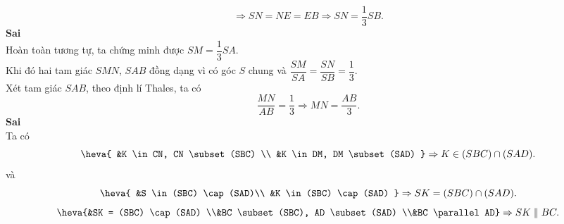 \begin{ex}
{\begin{itemchoice}
			 \[
			 \Rightarrow SN = NE = EB \Rightarrow SN = \dfrac{1}{3}SB.
			\] 
			 \itemch \textbf{Sai}\\
			Hoàn toàn  tương tự, ta chứng minh được $SM = \dfrac{1}{3}SA$.\\
			Khi đó hai tam giác $SMN$, $SAB$ đồng dạng vì  có góc $S$ chung và
			$\dfrac{SM}{SA} = \dfrac{SN}{SB} = \dfrac{1}{3}$.\\ 
			Xét tam giác $SAB$, theo định lí  Thales, ta có\\
			 \[
			 \dfrac{MN}{AB} = \dfrac{1}{3} \Rightarrow MN = \dfrac{AB}{3}.
			\] 
			\itemch \textbf{Sai} \\ 
			Ta  có
			\[ 
			 \heva{
			&K \in CN, CN \subset (SBC)  \\
			 &K \in DM, DM \subset (SAD)
			 }
			\Rightarrow K \in (SBC) \cap  (SAD).
			\] 
			 và
			 \[
			\heva{ 
			&S  \in (SBC) \cap (SAD)\\
			&K \in  (SBC) \cap (SAD)
			} 
			\Rightarrow SK =  (SBC) \cap (SAD).
			 \]
			 \[
			\heva{&SK = (SBC)  \cap (SAD) \\&BC \subset (SBC), AD \subset (SAD) \\&BC \parallel AD}
			\Rightarrow SK  \parallel BC.
			 \]
		\end{itemchoice}
	 }
\end{ex}

